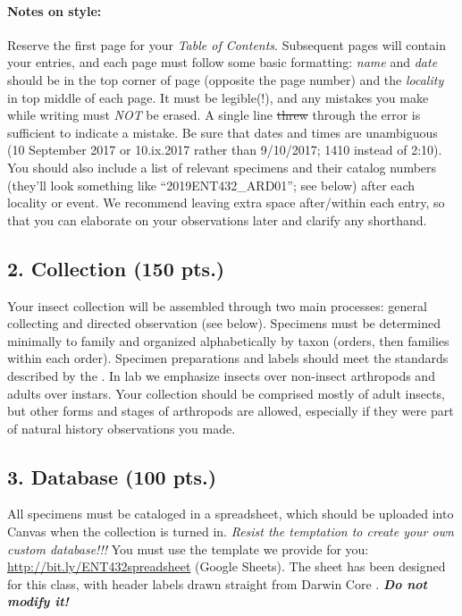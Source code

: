 \documentclass[letterpaper, 11pt]{article}
\begin{document}
\paragraph*{Notes on style:} Reserve the first page for your \textit{Table of Contents}. Subsequent pages will contain your entries, and each page must follow some basic formatting: \textit{name} and \textit{date} should be in the top corner of page (opposite the page number) and the \textit{locality} in top middle of each page. It must be legible(!), and any mistakes you make while writing must \textit{NOT} be erased. A single line \sout{threw} through the error is sufficient to indicate a mistake. Be sure that dates and times are unambiguous (10 September 2017 or 10.ix.2017 rather than 9/10/2017; 1410 instead of 2:10). You should also include a list of relevant specimens and their catalog numbers (they'll look something like ``2019ENT432\_ARD01''; see below) after each locality or event. We recommend leaving extra space after/within each entry, so that you can elaborate on your observations later and clarify any shorthand.

\subsection*{2. Collection (150 pts.)}
Your insect collection will be assembled through two main processes: general collecting and directed observation (see below). Specimens must be determined minimally to family and organized alphabetically by taxon (orders, then families within each order). Specimen preparations and labels should meet the standards described by the \cite{FrostSOP03}. In lab we emphasize insects over non-insect arthropods and adults over instars. Your collection should be comprised mostly of adult insects, but other forms and stages of arthropods are allowed, especially if they were part of natural history observations you made.

\subsection*{3. Database (100 pts.)}
All specimens must be cataloged in a spreadsheet, which should be uploaded into Canvas when the collection is turned in. \textit{Resist the temptation to create your own custom database!!!} You must use the template we provide for you: \url{http://bit.ly/ENT432spreadsheet} (Google Sheets). The sheet has been designed for this class, with header labels drawn straight from Darwin Core \citep{DarwinCore}. \textbf{\textit{Do not modify it!}} 
\end{document}
